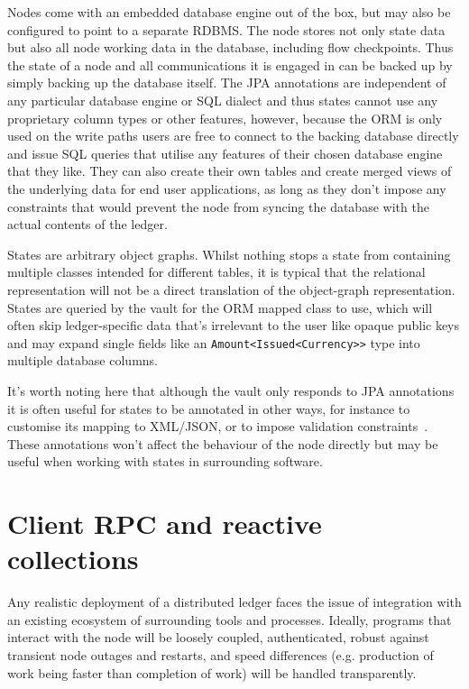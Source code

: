 \documentclass{article}
\begin{document}
Nodes come with an embedded database engine out of the box, but may also be configured to point to a separate
RDBMS. The node stores not only state data but also all node working data in the database, including flow
checkpoints. Thus the state of a node and all communications it is engaged in can be backed up by simply backing up
the database itself. The JPA annotations are independent of any particular database engine or SQL dialect and thus
states cannot use any proprietary column types or other features, however, because the ORM is only used on the
write paths users are free to connect to the backing database directly and issue SQL queries that utilise any
features of their chosen database engine that they like. They can also create their own tables and create merged
views of the underlying data for end user applications, as long as they don't impose any constraints that would
prevent the node from syncing the database with the actual contents of the ledger.

States are arbitrary object graphs. Whilst nothing stops a state from containing multiple classes intended for
different tables, it is typical that the relational representation will not be a direct translation of the
object-graph representation. States are queried by the vault for the ORM mapped class to use, which will often skip
ledger-specific data that's irrelevant to the user like opaque public keys and may expand single fields like an
\texttt{Amount<Issued<Currency>>} type into multiple database columns.

It's worth noting here that although the vault only responds to JPA annotations it is often useful for states to be
annotated in other ways, for instance to customise its mapping to XML/JSON, or to impose validation
constraints~\cite{BeanValidation}. These annotations won't affect the behaviour of the node directly but may be
useful when working with states in surrounding software.

\section{Client RPC and reactive collections}\label{sec:client-rpc-and-reactive-collections}

Any realistic deployment of a distributed ledger faces the issue of integration with an existing ecosystem of
surrounding tools and processes. Ideally, programs that interact with the node will be loosely coupled,
authenticated, robust against transient node outages and restarts, and speed differences (e.g. production of work
being faster than completion of work) will be handled transparently.
\end{document}
